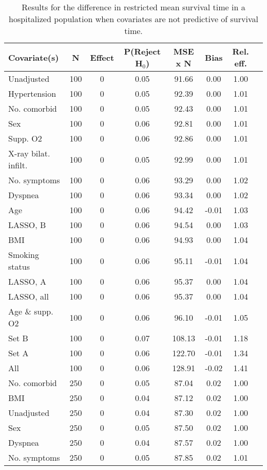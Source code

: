 \documentclass{article}
\begin{document}
{\tabcolsep=6pt  %
\begin{longtable}{lccccccc}
\caption{Results for the difference in restricted mean survival time in a hospitalized population when covariates are not predictive of survival time.}\label{tab7}\\
Covariate(s) & N & Effect & P(Reject H$_0$) & MSE x N & Bias & Rel. eff.\\ \midrule
Unadjusted & 100 & 0 & 0.05 & 91.66 & 0.00 & 1.00\\
Hypertension & 100 & 0 & 0.05 & 92.39 & 0.00 & 1.01\\
No. comorbid & 100 & 0 & 0.05 & 92.43 & 0.00 & 1.01\\
Sex & 100 & 0 & 0.06 & 92.81 & 0.00 & 1.01\\
Supp. O2 & 100 & 0 & 0.06 & 92.86 & 0.00 & 1.01\\
X-ray bilat. infilt. & 100 & 0 & 0.05 & 92.99 & 0.00 & 1.01\\
No. symptoms & 100 & 0 & 0.06 & 93.29 & 0.00 & 1.02\\
Dyspnea & 100 & 0 & 0.06 & 93.34 & 0.00 & 1.02\\
Age & 100 & 0 & 0.06 & 94.42 & -0.01 & 1.03\\
LASSO, B & 100 & 0 & 0.06 & 94.54 & 0.00 & 1.03\\
BMI & 100 & 0 & 0.06 & 94.93 & 0.00 & 1.04\\
Smoking status & 100 & 0 & 0.06 & 95.11 & -0.01 & 1.04\\
LASSO, A & 100 & 0 & 0.06 & 95.37 & 0.00 & 1.04\\
LASSO, all & 100 & 0 & 0.06 & 95.37 & 0.00 & 1.04\\
Age \& supp. O2 & 100 & 0 & 0.06 & 96.10 & -0.01 & 1.05\\
Set B & 100 & 0 & 0.07 & 108.13 & -0.01 & 1.18\\
Set A & 100 & 0 & 0.06 & 122.70 & -0.01 & 1.34\\
All & 100 & 0 & 0.06 & 128.91 & -0.02 & 1.41\\ \midrule
No. comorbid & 250 & 0 & 0.05 & 87.04 & 0.02 & 1.00\\
BMI & 250 & 0 & 0.04 & 87.12 & 0.02 & 1.00\\
Unadjusted & 250 & 0 & 0.04 & 87.30 & 0.02 & 1.00\\
Sex & 250 & 0 & 0.05 & 87.50 & 0.02 & 1.00\\
Dyspnea & 250 & 0 & 0.04 & 87.57 & 0.02 & 1.00\\
No. symptoms & 250 & 0 & 0.05 & 87.85 & 0.02 & 1.01\\

\end{longtable}}
\end{document}
